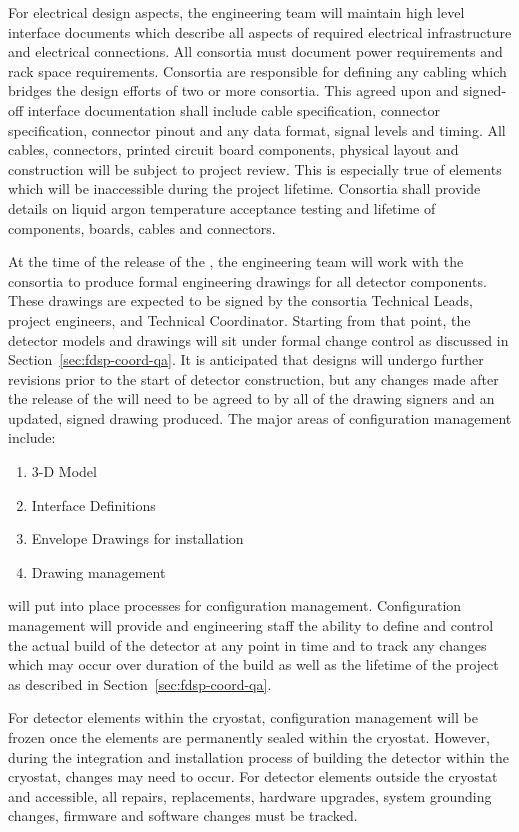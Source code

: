 For electrical design aspects, the  engineering team will maintain
high level interface documents which describe all aspects of required
electrical infrastructure and electrical connections. All consortia
must document power requirements and rack space
requirements. Consortia are responsible for defining any cabling which
bridges the design efforts of two or more consortia. This agreed upon
and signed-off interface documentation shall include cable
specification, connector specification, connector pinout and any data
format, signal levels and timing. All cables, connectors, printed
circuit board components, physical layout and construction will be
subject to project review. This is especially true of elements which
will be inaccessible during the project lifetime. Consortia shall
provide details on liquid argon temperature acceptance testing and
lifetime of components, boards, cables and connectors.


At the time of the release of the , the
 engineering team will work with the consortia to produce
formal engineering drawings for all detector components.  These
drawings are expected to be signed by the consortia Technical Leads,
project engineers, and Technical Coordinator.  Starting from that
point, the detector models and drawings will sit under formal change
control as discussed in Section~\ref{sec:fdsp-coord-qa}.  It is
anticipated that designs will undergo further revisions prior to the
start of detector construction, but any changes made after the release
of the  will need to be agreed to by all of
the drawing signers and an updated, signed drawing produced. The major
areas of configuration management include:
\begin{enumerate}
  \item 3-D Model
  \item Interface Definitions
  \item Envelope Drawings for installation
  \item Drawing management
\end{enumerate}

 will put into place processes for configuration
management.  Configuration management will provide 
and engineering staff the ability to define and control
the actual build of the detector at any point in time and to track any
changes which may occur over duration of the build as well as the
lifetime of the project as described in
Section~\ref{sec:fdsp-coord-qa}.

For detector elements within the cryostat, configuration management
will be frozen once the elements are permanently sealed within the
cryostat.  However, during the integration and installation process of
building the detector within the cryostat, changes may need to occur.
For detector elements outside the cryostat and accessible, all
repairs, replacements, hardware upgrades, system grounding changes,
firmware and software changes must be tracked.

